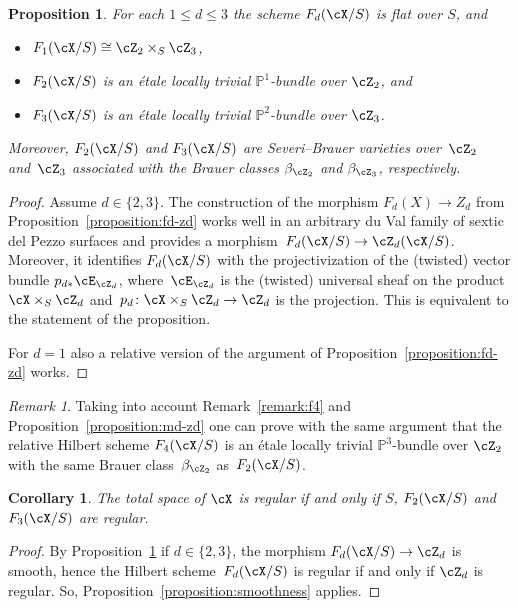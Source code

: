 \documentclass[11pt]{amsart}
\renewcommand{\P}{{\mathbb{P}}}
\theoremstyle{plain}
\newtheorem{proposition}[theorem]{Proposition}
\newtheorem{corollary}[theorem]{Corollary}
\theoremstyle{definition}
\theoremstyle{remark}
\newtheorem{remark}[theorem]{Remark}
\begin{document}
\begin{proposition}
\label{proposition:fd-md}
For each $1 \le d \le 3$ the scheme $F_d(\cX/S)$ is flat over $S$, and
\begin{itemize}
\item 
$F_1(\cX/S) \cong \cZ_2 \times_S \cZ_3$,
\item 
$F_2(\cX/S)$ is an \'etale locally trivial $\P^1$-bundle over $\cZ_2$, and 
\item 
$F_3(\cX/S)$ is an \'etale locally trivial $\P^2$-bundle over $\cZ_3$.
\end{itemize}
Moreover, $F_2(\cX/S)$ and $F_3(\cX/S)$ are Severi--Brauer varieties over~$\cZ_2$ and~$\cZ_3$
associated with the Brauer classes $\beta_{\cZ_2}$ and $\beta_{\cZ_3}$, respectively.
\end{proposition}


\begin{proof}
Assume $d \in \{2,3\}$.
The construction of the morphism $F_d(X) \to Z_d$ from Proposition~\ref{proposition:fd-zd} works well 
in an arbitrary du Val family of sextic del Pezzo surfaces and provides a morphism~\mbox{$F_d(\cX/S) \to \cZ_d(\cX/S)$}.
Moreover, it identifies $F_d(\cX/S)$ with the projectivization of the (twisted) vector bundle $p_{d*}\cE_{\cZ_d}$, 
where~$\cE_{\cZ_d}$ is the (twisted) universal sheaf on the product $\cX \times_S \cZ_d$ 
and~$p_{d} \colon \cX \times_S \cZ_d \to \cZ_d$ is the projection.
This is equivalent to the statement of the proposition.

For $d = 1$ also a relative version of the argument of Proposition~\ref{proposition:fd-zd} works.
\end{proof}

\begin{remark}
\label{remark:f4-family}
Taking into account Remark~\ref{remark:f4} and Proposition~\ref{proposition:md-zd} one can prove with the same argument
that the relative Hilbert scheme $F_4(\cX/S)$ is an \'etale locally trivial $\P^3$-bundle over $\cZ_2$ 
with the same Brauer class~$\beta_{\cZ_2}$ as~$F_2(\cX/S)$.
\end{remark}

\begin{corollary}
The total space of $\cX$ is regular if and only if $S$, $F_2(\cX/S)$ and $F_3(\cX/S)$ are regular.
\end{corollary}
\begin{proof}
By Proposition~\ref{proposition:fd-md} if $d \in \{2,3\}$, the morphism $F_d(\cX/S) \to \cZ_d$ is smooth, 
hence the Hilbert scheme~$F_d(\cX/S)$ is regular if and only if $\cZ_d$ is regular.
So, Proposition~\ref{proposition:smoothness} applies.
\end{proof}
\end{document}
